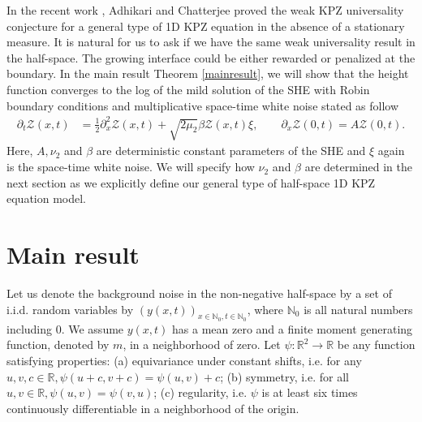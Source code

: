 \documentclass[10pt]{article}
\begin{document}
In the recent work \cite{adhikari2022invariance}, Adhikari and Chatterjee proved the weak KPZ universality conjecture for a general type of 1D KPZ equation in the absence of a stationary measure.
It is natural for us to ask if we have the same weak universality result in the half-space. The growing interface could be either rewarded or penalized at the boundary. In the main result Theorem \ref{mainresult}, we will show that the height function converges to the log of the mild solution of the SHE with Robin boundary conditions and multiplicative space-time white noise stated as follow
\begin{align*}
    \partial_{t} \mathcal{Z}(x,t)&=\frac{1}{2} \partial_{x}^{2} \mathcal{Z}(x,t)+\sqrt{2 \mu_{2}} \beta \mathcal{Z}(x,t) \xi, \qquad
    \partial_x \mathcal{Z}(0,t)=A\mathcal{Z}(0,t).
\end{align*}
Here, $A, \nu_2$ and $\beta$ are deterministic constant parameters of the SHE and $\xi$ again is the space-time white noise. We will specify how $\nu_2$ and $\beta$ are determined in the next section as we explicitly define our general type of half-space 1D KPZ equation model.

\section{Main result}
Let us denote the background noise in the non-negative half-space by a set of i.i.d. random variables by $(y(x, t))_{x \in \mathbb{N}_{0}, t \in \mathbb{N}_{0}}$, where $\mathbb{N}_0$ is all natural numbers including 0. We assume $y(x,t)$ has a mean zero and a finite moment generating function, denoted by $m$, in a neighborhood of zero. Let $\psi: \mathbb{R}^{2} \rightarrow \mathbb{R}$ be any function satisfying properties: (a) equivariance under constant shifts, i.e. for any $u, v, c \in \mathbb{R}, \psi(u+c, v+c)=\psi(u, v)+c$; (b) symmetry, i.e. for all $u, v \in \mathbb{R}, \psi(u, v)=\psi(v, u)$; (c) regularity, i.e. $\psi$ is at least six times continuously differentiable in a neighborhood of the origin. 
\end{document}

